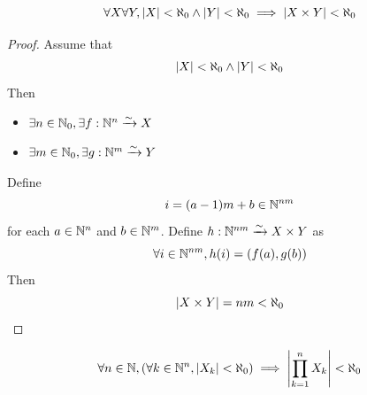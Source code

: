 \bigskip

\begin{lemma} \label{an:lem:product-of-two-finite-sets-is-finite}
    \[
    \forall X \forall Y, \abs*{X} < \aleph_{0} \land \abs*{Y} < \aleph_{0} \implies \abs*{X \times Y} < \aleph_{0}
    \]
\end{lemma}

\begin{proof}
    Assume that
    \[
    \abs*{X} < \aleph_{0} \land \abs*{Y} < \aleph_{0}
    \]
    Then
    \begin{itemize}
        \item $\exists n \in \N_{0}, \exists f: \N^{n} \xrightarrow{\sim} X$
        \item $\exists m \in \N_{0}, \exists g: \N^{m} \xrightarrow{\sim} Y$
    \end{itemize}
    Define
    \[
    i = (a - 1)m + b \in \N^{nm}
    \]
    for each $a \in \N^{n}$ and $b \in \N^{m}$. Define $h: \N^{nm} \xrightarrow{\sim} X \times Y$ as
    \[
    \forall i \in \N^{nm}, h(i) = \paren*{f(a), g(b)}
    \]
    Then
    \[
    \abs*{X \times Y} = nm < \aleph_{0}
    \]
\end{proof}

\bigskip

\begin{theorem} \label{an:thm:product-of-finite-sets-is-finite}
    \[
    \forall n \in \N, \paren*{\forall k \in \N^{n}, \abs*{X_{k}} < \aleph_{0}}
    \implies \abs*{\prod_{k = 1}^{n} X_{k}} < \aleph_{0}
    \]
\end{theorem}

